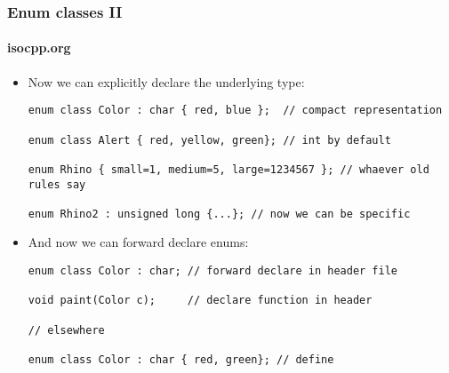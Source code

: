 \begin{frame}[fragile]
\frametitle{Enum classes II}
\framesubtitle{isocpp.org}
\begin{itemize}
\item Now we can explicitly declare the underlying type:
{\scriptsize
\begin{verbatim}
enum class Color : char { red, blue };  // compact representation

enum class Alert { red, yellow, green}; // int by default

enum Rhino { small=1, medium=5, large=1234567 }; // whaever old rules say

enum Rhino2 : unsigned long {...}; // now we can be specific
\end{verbatim}
}
\pause{}

\vskip 6pt

\item And now we can forward declare enums:

{\scriptsize
\begin{verbatim}
enum class Color : char; // forward declare in header file

void paint(Color c);     // declare function in header

// elsewhere

enum class Color : char { red, green}; // define
\end{verbatim}
}

\end{itemize}


\end{frame}

